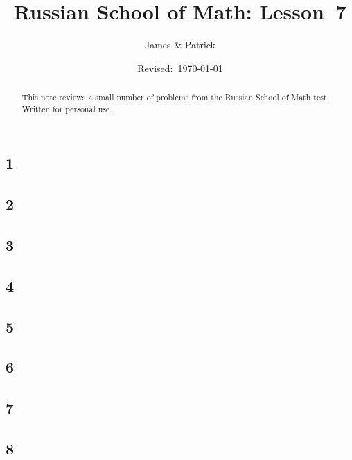 \documentclass[12pt]{article}
\title{Russian School of Math: Lesson~7}
\author{James \& Patrick}
\date{Revised:~\today}
\begin{document}
\maketitle
\begin{abstract}\setlength{\parindent}{0pt}%
This note reviews a small number of problems from the Russian School of Math test. Written for personal use.
\end{abstract}

\thispagestyle{empty}
\clearpage

\subsection*{1}

\begin{solution}
  
\end{solution}

\subsection*{2}

\begin{solution}
  
\end{solution}

\subsection*{3}

\begin{solution}
  
\end{solution}

\subsection*{4}

\begin{solution}
  
\end{solution}

\subsection*{5}

\begin{solution}
  
\end{solution}

\subsection*{6}

\begin{solution}
  
\end{solution}

\subsection*{7}

\begin{solution}
  
\end{solution}

\subsection*{8}

\begin{solution}
  
\end{solution}
\end{document}
